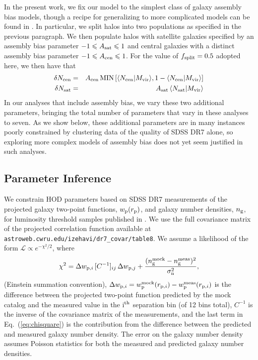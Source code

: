 \documentclass[usenatbib,usegraphicx,letterpaper]{mn2e}
\newcommand{\mvir}{M_{\rm vir}}
\begin{document}
In the present work, we fix our model to the simplest class of galaxy
assembly bias models, though a recipe for generalizing to more
complicated models can be found in \citet{hearin_etal16}. In
particular, we split halos into two populations as specified in the
previous paragraph. We then populate halos with satellite galaxies
specified by an assembly bias parameter $-1 \le A_{\rm sat} \le 1$ and
central galaxies with a distinct assembly bias parameter
$-1 \le A_{\rm cen} \le 1$. For the value of $f_{\rm split}=0.5$ adopted here,
we then have that
%
\begin{eqnarray}
%
\delta N_{\rm cen} & = & A_{\rm cen} \, {\rm MIN} \left[ \langle N_{\mathrm{cen}} \vert \mvir \rangle ,
1- \langle N_{\mathrm{cen}} \vert \mvir \rangle \right]  \nonumber \\ 
\delta N_{\rm sat} & = & A_{\rm sat} \, \langle N_{\mathrm{sat}} \vert \mvir \rangle
\end{eqnarray}
%
In our analyses that include assembly bias, we vary these two
additional parameters, bringing the total number of parameters
that vary in these analyses to seven. As we show below, these additional
parameters are in many instances poorly constrained by clustering data
of the quality of SDSS DR7 alone, so exploring more complex models of
assembly bias does not yet seem justified in such analyses.


\subsection{Parameter Inference}
\label{subsection:mcmc}

We constrain HOD parameters based on SDSS DR7 measurements of the projected
galaxy two-point functions, $w_{\rm p}(r_{\rm p})$, and galaxy number densities, $n_{\rm g}$,
for luminosity threshold samples published in \citet{zehavi_etal11}. We use the full covariance
matrix of the projected correlation function available at
{\tt astroweb.cwru.edu/izehavi/dr7\_covar/table8}. We assume a likelihood of the
form $\mathcal{L} \propto e^{-\chi^2/2}$, where
%
\begin{equation}
\label{eq:chisquare}
\chi^2 = \Delta w_{{\rm p},i} \, [C^{-1}]_{ij} \, \Delta w_{{\rm p},j} + \frac{(n_{\rm g}^{\rm mock} - n_{\rm g}^{\rm meas})^2}{\sigma_{\rm n}^2},
\end{equation}
%
(Einstein summation convention), $\Delta w_{{\rm p},i} = w_{\rm p}^{\rm
  mock}(r_{{\rm p},i}) - w_{\rm p}^{\rm meas}(r_{{\rm p},i})$ is the
difference between the projected two-point function predicted by the
mock catalog and the measured value in the i$^{\rm th}$ separation bin
(of 12 bins total), $C^{-1}$ is the inverse of the covariance matrix
of the measurements, and the last term in Eq.~(\ref{eq:chisquare}) is
the contribution from the difference between the predicted and
measured galaxy number density. The error on the galaxy number density
assumes Poisson statistics for both the measured and predicted galaxy
number densities.
\end{document}
